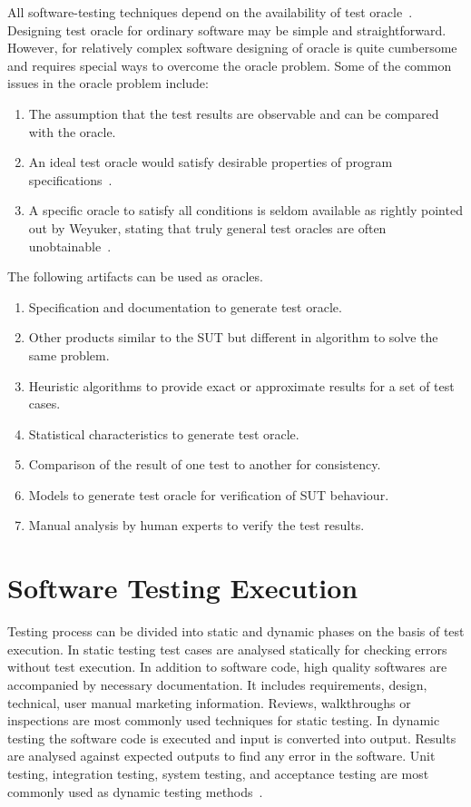 All software-testing techniques depend on the availability of test oracle~\cite{gaudel2010software}. Designing test oracle for ordinary software may be simple and straightforward. However, for relatively complex software designing of oracle is quite cumbersome and requires special ways to overcome the oracle problem. Some of the common issues in the oracle problem include:
\begin{enumerate}
\item The assumption that the test results are observable and can be compared with the oracle.
\item An ideal test oracle would satisfy desirable properties of program specifications~\cite{baresi2001test}.
\item A specific oracle to satisfy all conditions is seldom available as rightly pointed out by Weyuker, stating that truly general test oracles are often unobtainable~\cite{weyuker1982testing}. 
\end{enumerate}

The following artifacts can be used as oracles.
\begin{enumerate}
\item Specification and documentation to generate test oracle. 
\item Other products similar to the SUT but different in algorithm to solve the same problem.
\item Heuristic algorithms to provide exact or approximate results for a set of test cases. %
\item Statistical characteristics to generate test oracle. %
\item Comparison of the result of one test to another for consistency. %
\item Models to generate test oracle for verification of SUT behaviour. %
\item Manual analysis by human experts to verify the test results. %
\end{enumerate}

\section{Software Testing Execution}
Testing process can be divided into static and dynamic phases on the basis of test execution. In static testing test cases are analysed statically for checking errors without test execution. In addition to software code, high quality softwares are accompanied by necessary documentation. It includes requirements, design, technical, user manual marketing information. Reviews, walkthroughs or inspections are most commonly used techniques for static testing. In dynamic testing the software code is executed and input is converted into output. Results are analysed against expected outputs to find any error in the software. Unit testing, integration testing, system testing, and acceptance testing are most commonly used as dynamic testing methods~\cite{fairley1978tutorial}.

